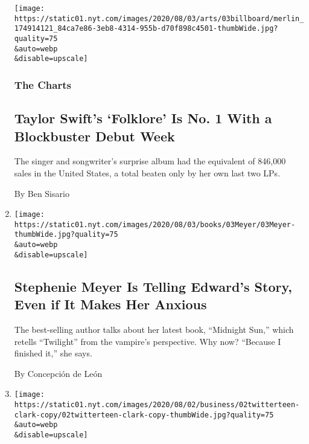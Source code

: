 \begin{enumerate}
  \texttt{[image: https://static01.nyt.com/images/2020/08/03/arts/03billboard/merlin\_174914121\_84ca7e86-3eb8-4314-955b-d70f898c4501-thumbWide.jpg?quality=75\\\&auto=webp\\\&disable=upscale]}

  \hypertarget{the-charts}{%
  \subsubsection{The Charts}\label{the-charts}}

  \hypertarget{taylor-swifts-folklore-is-no-1-with-a-blockbuster-debut-week}{%
  \subsection{Taylor Swift's `Folklore' Is No. 1 With a Blockbuster
  Debut
  Week}\label{taylor-swifts-folklore-is-no-1-with-a-blockbuster-debut-week}}

  The singer and songwriter's surprise album had the equivalent of
  846,000 sales in the United States, a total beaten only by her own
  last two LPs.

  By Ben Sisario
\item
  \href{/2020/08/03/books/midnight-sun-stephenie-meyer-twilight.html}{}

  \texttt{[image: https://static01.nyt.com/images/2020/08/03/books/03Meyer/03Meyer-thumbWide.jpg?quality=75\\\&auto=webp\\\&disable=upscale]}

  \hypertarget{stephenie-meyer-is-telling-edwards-story-even-if-it-makes-her-anxious}{%
  \subsection{Stephenie Meyer Is Telling Edward's Story, Even if It
  Makes Her
  Anxious}\label{stephenie-meyer-is-telling-edwards-story-even-if-it-makes-her-anxious}}

  The best-selling author talks about her latest book, ``Midnight Sun,''
  which retells ``Twilight'' from the vampire's perspective. Why now?
  ``Because I finished it,'' she says.

  By Concepción de León
\item
  \href{/2020/08/02/technology/florida-teenager-twitter-hack.html}{}

  \texttt{[image: https://static01.nyt.com/images/2020/08/02/business/02twitterteen-clark-copy/02twitterteen-clark-copy-thumbWide.jpg?quality=75\\\&auto=webp\\\&disable=upscale]}

  \hypertarget{from-minecraft-tricks-to-twitter-hack-a-florida-teens-troubled-online-path}{%
}
\end{enumerate}
